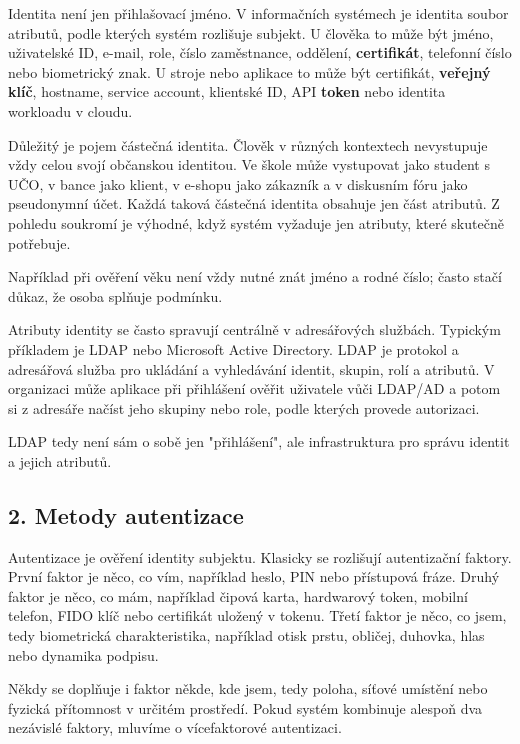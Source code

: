 Identita není jen přihlašovací jméno. V informačních systémech je identita soubor atributů, podle kterých systém rozlišuje subjekt. U člověka to může být jméno, uživatelské ID, e-mail, role, číslo zaměstnance, oddělení, \textbf{certifikát}, telefonní číslo nebo biometrický znak. U stroje nebo aplikace to může být certifikát, \textbf{veřejný klíč}, hostname, service account, klientské ID, API \textbf{token} nebo identita workloadu v cloudu.

Důležitý je pojem částečná identita. Člověk v různých kontextech nevystupuje vždy celou svojí občanskou identitou. Ve škole může vystupovat jako student s UČO, v bance jako klient, v e-shopu jako zákazník a v diskusním fóru jako pseudonymní účet. Každá taková částečná identita obsahuje jen část atributů. Z pohledu soukromí je výhodné, když systém vyžaduje jen atributy, které skutečně potřebuje.

Například při ověření věku není vždy nutné znát jméno a rodné číslo; často stačí důkaz, že osoba splňuje podmínku.

Atributy identity se často spravují centrálně v adresářových službách. Typickým příkladem je LDAP nebo Microsoft Active Directory. LDAP je protokol a adresářová služba pro ukládání a vyhledávání identit, skupin, rolí a atributů. V organizaci může aplikace při přihlášení ověřit uživatele vůči LDAP/AD a potom si z adresáře načíst jeho skupiny nebo role, podle kterých provede autorizaci.

LDAP tedy není sám o sobě jen "přihlášení", ale infrastruktura pro správu identit a jejich atributů.

\subsection*{2. Metody autentizace}

Autentizace je ověření identity subjektu. Klasicky se rozlišují autentizační faktory. První faktor je něco, co vím, například heslo, PIN nebo přístupová fráze. Druhý faktor je něco, co mám, například čipová karta, hardwarový token, mobilní telefon, FIDO klíč nebo certifikát uložený v tokenu. Třetí faktor je něco, co jsem, tedy biometrická charakteristika, například otisk prstu, obličej, duhovka, hlas nebo dynamika podpisu.

Někdy se doplňuje i faktor někde, kde jsem, tedy poloha, síťové umístění nebo fyzická přítomnost v určitém prostředí. Pokud systém kombinuje alespoň dva nezávislé faktory, mluvíme o vícefaktorové autentizaci.

